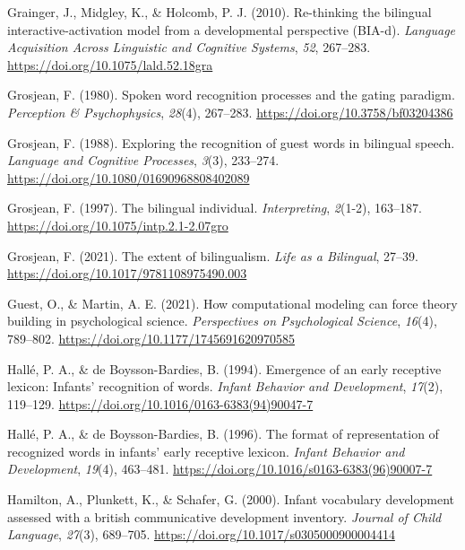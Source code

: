 \documentclass[
  12pt,
  b5paperpaper,
  twoside]{scrreprt}
\newlength{\cslhangindent}
\newlength{\cslentryspacingunit} %
\newenvironment{CSLReferences}[2] %
 {%
  \setlength{\parindent}{0pt}
  \ifodd #1
  \let\oldpar\par
  \def\par{\hangindent=\cslhangindent\oldpar}
  \fi
  \setlength{\parskip}{#2\cslentryspacingunit}
 }%
 {}
\begin{document}
\begin{CSLReferences}{1}{0}
\leavevmode{}%
Grainger, J., Midgley, K., \& Holcomb, P. J. (2010). Re-thinking the
bilingual interactive-activation model from a developmental perspective
({BIA-d}). \emph{Language Acquisition Across Linguistic and Cognitive
Systems}, \emph{52}, 267--283.
\url{https://doi.org/10.1075/lald.52.18gra}

\leavevmode{}%
Grosjean, F. (1980). Spoken word recognition processes and the gating
paradigm. \emph{Perception \& Psychophysics}, \emph{28}(4), 267--283.
\url{https://doi.org/10.3758/bf03204386}

\leavevmode{}%
Grosjean, F. (1988). Exploring the recognition of guest words in
bilingual speech. \emph{Language and Cognitive Processes}, \emph{3}(3),
233--274. \url{https://doi.org/10.1080/01690968808402089}

\leavevmode{}%
Grosjean, F. (1997). The bilingual individual. \emph{Interpreting},
\emph{2}(1-2), 163--187. \url{https://doi.org/10.1075/intp.2.1-2.07gro}

\leavevmode{}%
Grosjean, F. (2021). The extent of bilingualism. \emph{Life as a
Bilingual}, 27--39. \url{https://doi.org/10.1017/9781108975490.003}

\leavevmode{}%
Guest, O., \& Martin, A. E. (2021). How computational modeling can force
theory building in psychological science. \emph{Perspectives on
Psychological Science}, \emph{16}(4), 789--802.
\url{https://doi.org/10.1177/1745691620970585}

\leavevmode{}%
Hallé, P. A., \& de Boysson-Bardies, B. (1994). Emergence of an early
receptive lexicon: Infants' recognition of words. \emph{Infant Behavior
and Development}, \emph{17}(2), 119--129.
\url{https://doi.org/10.1016/0163-6383(94)90047-7}

\leavevmode{}%
Hallé, P. A., \& de Boysson-Bardies, B. (1996). The format of
representation of recognized words in infants' early receptive lexicon.
\emph{Infant Behavior and Development}, \emph{19}(4), 463--481.
\url{https://doi.org/10.1016/s0163-6383(96)90007-7}

\leavevmode{}%
Hamilton, A., Plunkett, K., \& Schafer, G. (2000). Infant vocabulary
development assessed with a british communicative development inventory.
\emph{Journal of Child Language}, \emph{27}(3), 689--705.
\url{https://doi.org/10.1017/s0305000900004414}


\end{CSLReferences}
\end{document}
